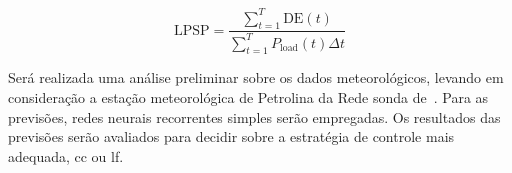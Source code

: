 \begin{equation}
	\text{LPSP} = \frac{\sum_{t=1}^{T} \text{DE}(t)}{\sum_{t=1}^{T} P_{\text{load}}{(t)}\Delta t}
	\label{eq:lpsp}
\end{equation}

Será realizada uma análise preliminar sobre os dados meteorológicos, levando em
consideração a estação meteorológica de Petrolina da Rede \acrshort{sonda}
de~\cite{inpe:sonda}.  Para as previsões, redes neurais recorrentes simples
serão empregadas. Os resultados das previsões serão avaliados para decidir sobre
a estratégia de controle mais adequada, \acrlong{cc} ou \acrlong{lf}.
